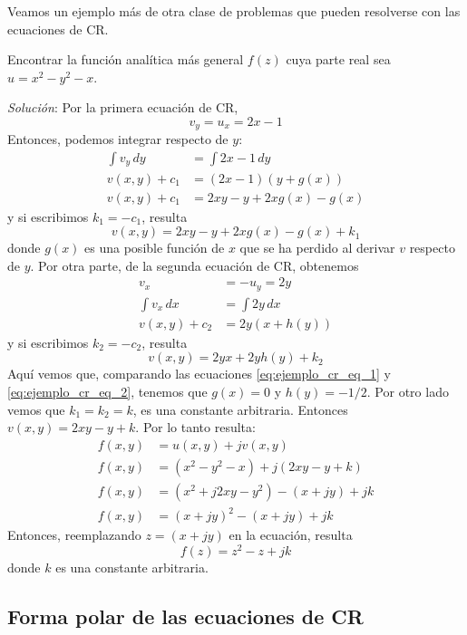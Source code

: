 Veamos un ejemplo más de otra clase de problemas que pueden resolverse con las ecuaciones de CR.
\begin{example}
  Encontrar la función analítica más general $f(z)$ cuya parte real sea $u=x^2-y^2-x$.

  \textit{Solución}: Por la primera ecuación de CR,
  \[
    v_y = u_x = 2x-1
  \]
  Entonces, podemos integrar respecto de $y$:
  \begin{align*}
    \int v_y \, dy &= \int 2x -1 \, dy \\ 
    v(x,y) + c_1 &= (2x-1)(y+g(x)) \\ 
    v(x,y) + c_1 &= 2xy - y + 2xg(x) - g(x) 
  \end{align*}
  y si escribimos $k_1=-c_1$, resulta
  \begin{equation}\label{eq:ejemplo_cr_eq_1}
    v(x,y) = 2xy - y + 2xg(x) - g(x) + k_1
  \end{equation}
  donde $g(x)$ es una posible función de $x$ que se ha perdido al derivar $v$ respecto de $y$. Por otra parte, de la segunda ecuación de CR, obtenemos
  \begin{align*}
    v_x &= -u_y = 2y \\ 
    \int v_x \,dx &= \int 2y \, dx \\ 
    v(x,y) + c_2 &= 2y (x + h(y)) 
  \end{align*}
  y si escribimos $k_2=-c_2$, resulta
  \begin{equation}\label{eq:ejemplo_cr_eq_2}
    v(x,y) = 2yx + 2yh(y) + k_2
  \end{equation}
  Aquí vemos que, comparando las ecuaciones \ref{eq:ejemplo_cr_eq_1} y \ref{eq:ejemplo_cr_eq_2}, tenemos que $g(x)=0$ y $h(y)=-1/2$. Por otro lado vemos que $k_1 = k_2 = k$, es una constante arbitraria. Entonces $v(x,y)=2xy - y + k$. Por lo tanto resulta:
  \begin{align*}
    f(x,y) &= u(x,y) + jv(x,y) \\ 
    f(x,y) &= (x^2-y^2-x) + j(2xy - y + k) \\ 
    f(x,y) &= (x^2 + j2xy - y^2) - (x+jy) + jk \\ 
    f(x,y) &= (x+jy)^2 - (x+jy) + jk
  \end{align*}
  Entonces, reemplazando $z=(x+jy)$ en la ecuación, resulta
  \[
    \boxed{f(z) = z^2 - z + jk}
  \]
  donde $k$ es una constante arbitraria.
\end{example}

\subsection{Forma polar de las ecuaciones de CR}

